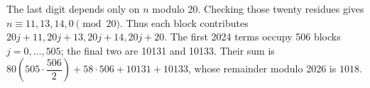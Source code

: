 The last digit depends only on $n$ modulo 20. Checking those twenty residues gives $n\equiv11,13,14,0\pmod{20}$. Thus each block contributes $20j+11,20j+13,20j+14,20j+20$. The first 2024 terms occupy 506 blocks $j=0,\ldots,505$; the final two are 10131 and 10133. Their sum is $80 (505 \cdot \dfrac{506}{2}) + 58 \cdot 506 + 10131 + 10133$, whose remainder modulo 2026 is $\boxed{1018}$.
